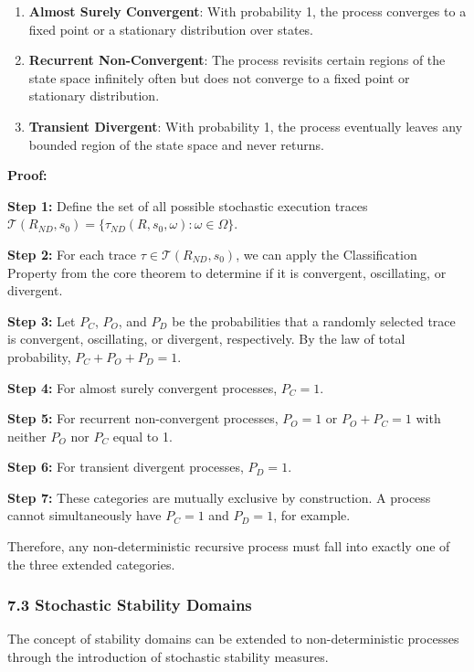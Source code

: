 \documentclass[
]{article}
\begin{document}
\begin{enumerate}
\def\labelenumi{\arabic{enumi}.}
\item
  \textbf{Almost Surely Convergent}: With probability 1, the process
  converges to a fixed point or a stationary distribution over states.
\item
  \textbf{Recurrent Non-Convergent}: The process revisits certain
  regions of the state space infinitely often but does not converge to a
  fixed point or stationary distribution.
\item
  \textbf{Transient Divergent}: With probability 1, the process
  eventually leaves any bounded region of the state space and never
  returns.
\end{enumerate}

\textbf{Proof:}

\textbf{Step 1:} Define the set of all possible stochastic execution
traces
\(\mathcal{T}(R_{ND}, s_0) = \{\tau_{ND}(R, s_0, \omega) : \omega \in \Omega\}\).

\textbf{Step 2:} For each trace \(\tau \in \mathcal{T}(R_{ND}, s_0)\),
we can apply the Classification Property from the core theorem to
determine if it is convergent, oscillating, or divergent.

\textbf{Step 3:} Let \(P_C\), \(P_O\), and \(P_D\) be the probabilities
that a randomly selected trace is convergent, oscillating, or divergent,
respectively. By the law of total probability, \(P_C + P_O + P_D = 1\).

\textbf{Step 4:} For almost surely convergent processes, \(P_C = 1\).

\textbf{Step 5:} For recurrent non-convergent processes, \(P_O = 1\) or
\(P_O + P_C = 1\) with neither \(P_O\) nor \(P_C\) equal to 1.

\textbf{Step 6:} For transient divergent processes, \(P_D = 1\).

\textbf{Step 7:} These categories are mutually exclusive by
construction. A process cannot simultaneously have \(P_C = 1\) and
\(P_D = 1\), for example.

Therefore, any non-deterministic recursive process must fall into
exactly one of the three extended categories.

\subsubsection{7.3 Stochastic Stability
Domains}\label{stochastic-stability-domains}

The concept of stability domains can be extended to non-deterministic
processes through the introduction of stochastic stability measures.
\end{document}
